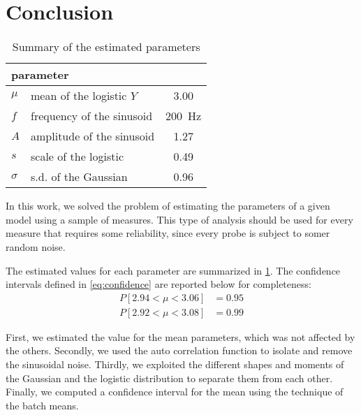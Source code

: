 \section{Conclusion}
\label{sec:conclusion}

\begin{table}
	\centering
	\caption{Summary of the estimated parameters}
	\label{tab:summary}
	\begin{tabular}{l>{\raggedright}p{3cm}c}
    	\toprule
    		\multicolumn{2}{l}{parameter} & \multicolumn{1}{c}{value} \\
    	\midrule
    		$\mu$    & mean of the logistic $Y$  & 3.00              \\
    		$f$      & frequency of the sinusoid & \SI{200}{\hertz}  \\
    		$A$      & amplitude of the sinusoid & 1.27              \\
    		$s$      & scale of the logistic     & 0.49              \\
    		$\sigma$ & s.d. of the Gaussian      & 0.96              \\
    	\bottomrule
	\end{tabular}
\end{table}


In this work, we solved the problem of estimating the parameters of a given model using a sample of measures.
This type of analysis should be used for every measure that requires some reliability, since every probe is subject to somer random noise.

The estimated values for each parameter are summarized in \cref{tab:summary}.
The confidence intervals defined in \cref{eq:confidence} are reported below for completeness:
\begin{align*}
    P[2.94 < \mu < 3.06] &= 0.95 \\
    P[2.92 < \mu < 3.08] &= 0.99
\end{align*}

First, we estimated the value for the mean parameters, which was not affected by the others.
Secondly, we used the auto correlation function to isolate and remove the sinusoidal noise.
Thirdly, we exploited the different shapes and moments of the Gaussian and the logistic distribution to separate them from each other.
Finally, we computed a confidence interval for the mean using the technique of the batch means.
